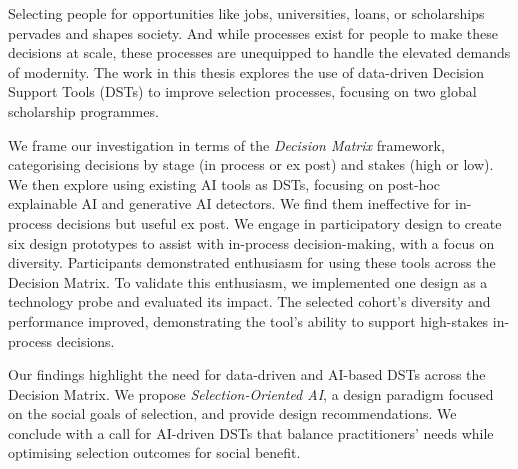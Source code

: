 Selecting people for opportunities like jobs, universities, loans, or scholarships pervades and shapes society. And while processes exist for people to make these decisions at scale, these processes are unequipped to handle the elevated demands of modernity. The work in this thesis explores the use of data-driven Decision Support Tools (DSTs) to improve selection processes, focusing on two global scholarship programmes.

We frame our investigation in terms of the \emph{Decision Matrix} framework, categorising decisions by stage (in process or ex post) and stakes (high or low). We then explore using existing AI tools as DSTs, focusing on post-hoc explainable AI and generative AI detectors. We find them ineffective for in-process decisions but useful ex post. We engage in participatory design to create six design prototypes to assist with in-process decision-making, with a focus on diversity. Participants demonstrated enthusiasm for using these tools across the Decision Matrix. To validate this enthusiasm, we implemented one design as a technology probe and evaluated its impact. The selected cohort's diversity and performance improved, demonstrating the tool's ability to support high-stakes in-process decisions. 

Our findings highlight the need for data-driven and AI-based DSTs across the Decision Matrix. We propose \emph{Selection-Oriented AI}, a design paradigm focused on the social goals of selection, and provide design recommendations. We conclude with a call for AI-driven DSTs that balance practitioners' needs while optimising selection outcomes for social benefit.